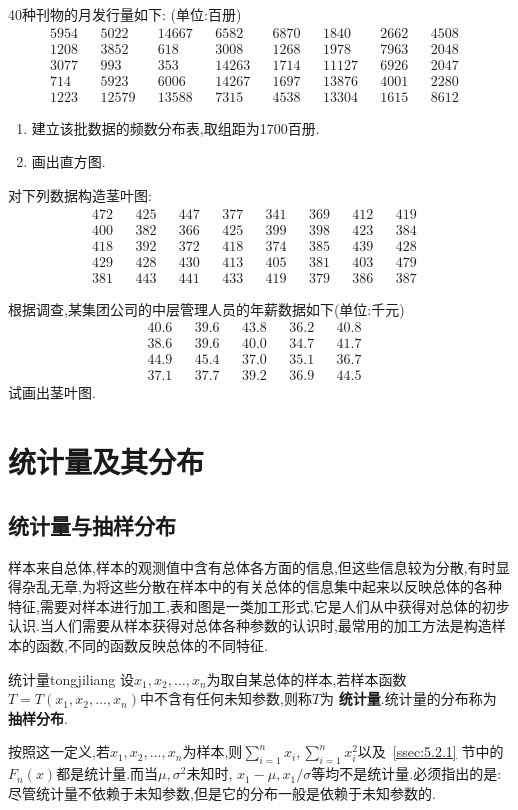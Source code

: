 \begin{xiti}
\item 40种刊物的月发行量如下: (单位:百册)
\begin{align*}
5954&&5022&&14667&&6582&&6870&&1840&&2662&&4508&\\
1208&&3852&&618&&3008&&1268&&1978&&7963&&2048&\\
3077&&993&&353&&14263&&1714&&11127&&6926&&2047&\\
714&&5923&&6006&&14267&&1697&&13876&&4001&&2280&\\
1223&&12579&&13588&&7315&&4538&&13304&&1615&&8612&
\end{align*}
\begin{enumerate}
\item 建立该批数据的频数分布表,取组距为1700百册.
\item 画出直方图.
\end{enumerate}
\item 对下列数据构造茎叶图:
\begin{align*}
472&&425&&447&&377&&341&&369&&412&&419&\\
400&&382&&366&&425&&399&&398&&423&&384&\\
418&&392&&372&&418&&374&&385&&439&&428&\\
429&&428&&430&&413&&405&&381&&403&&479&\\
381&&443&&441&&433&&419&&379&&386&&387&
\end{align*}
\item 根据调查,某集团公司的中层管理人员的年薪数据如下(单位:千元)
\begin{align*}
40.6&&39.6&&43.8&&36.2&&40.8&\\
38.6&&39.6&&40.0&&34.7&&41.7&\\
44.9&&45.4&&37.0&&35.1&&36.7&\\
37.1&&37.7&&39.2&&36.9&&44.5&
\end{align*}
试画出茎叶图.
\end{xiti}
\section{统计量及其分布\label{sec:5.3}}
\subsection{统计量与抽样分布\label{ssec:5.3.1}}
样本来自总体,样本的观测值中含有总体各方面的信息,但这些信息较为分散,有时显得杂乱无章,为将这些分散在样本中的有关总体的信息集中起来以反映总体的各种特征,需要对样本进行加工,表和图是一类加工形式,它是人们从中获得对总体的初步认识.当人们需要从样本获得对总体各种参数的认识时,最常用的加工方法是构造样本的函数,不同的函数反映总体的不同特征.
\begin{definition}{统计量}{tongjiliang}
设$x_1,x_2,\dotsc,x_n$为取自某总体的样本,若样本函数$T=T(x_1,x_2,\dotsc,x_n)$中不含有任何未知参数,则称$T$为 \textbf{统计量}.统计量的分布称为 \textbf{抽样分布}.
\end{definition}
按照这一定义,若$x_1,x_2,\dotsc,x_n$为样本,则$\sum_{i=1}^nx_i,\sum_{i=1}^nx_i^2$以及~\ref{ssec:5.2.1} 节中的$F_n(x)$都是统计量.而当$\mu,\sigma^2$未知时, $x_1-\mu,x_1/\sigma$等均不是统计量.必须指出的是: 尽管统计量不依赖于未知参数,但是它的分布一般是依赖于未知参数的.

